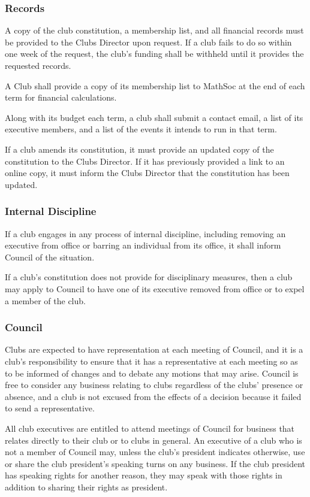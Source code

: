 \subsubsection{Records}
A copy of the club constitution, a membership list, and all financial records
must be provided to the Clubs Director upon request. If a club fails to do so
within one week of the request, the club's funding shall be withheld until it
provides the requested records.

A Club shall provide a copy of its membership list to MathSoc at the end of each
term for financial calculations.

Along with its budget each term, a club shall submit a contact email, a list of
its executive members, and a list of the events it intends to run in that term.

If a club amends its constitution, it must provide an updated copy of the
constitution to the Clubs Director. If it has previously provided a link to an
online copy, it must inform the Clubs Director that the constitution has been
updated.

\subsubsection{Internal Discipline}
If a club engages in any process of internal discipline, including removing an
executive from office or barring an individual from its office, it shall inform
Council of the situation.

If a club's constitution does not provide for disciplinary measures, then a club
may apply to Council to have one of its executive removed from office or to
expel a member of the club.

\subsubsection{Council}
Clubs are expected to have representation at each meeting of Council, and it is
a club's responsibility to ensure that it has a representative at each meeting
so as to be informed of changes and to debate any motions that may arise.
Council is free to consider any business relating to clubs regardless of the
clubs' presence or absence, and a club is not excused from the effects of a
decision because it failed to send a representative.

All club executives are entitled to attend meetings of Council for business that
relates directly to their club or to clubs in general. An executive of a club
who is not a member of Council may, unless the club's president indicates
otherwise, use or share the club president's speaking turns on any business. If
the club president has speaking rights for another reason, they may speak with
those rights in addition to sharing their rights as president.

